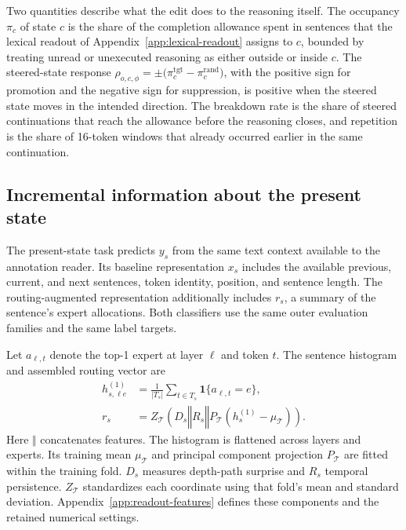 Two quantities describe what the edit does to the reasoning itself.
%
The occupancy $\pi_c$ of state $c$ is the share of the completion allowance spent in sentences that the lexical readout of Appendix~\ref{app:lexical-readout} assigns to $c$, bounded by treating unread or unexecuted reasoning as either outside or inside $c$.
%
The steered-state response $\rho_{o,c,\phi}=\pm\bigl(\pi^{\mathrm{tgt}}_c-\pi^{\mathrm{rand}}_c\bigr)$, with the positive sign for promotion and the negative sign for suppression, is positive when the steered state moves in the intended direction.
%
The breakdown rate is the share of steered continuations that reach the allowance before the reasoning closes, and repetition is the share of 16-token windows that already occurred earlier in the same continuation.
%

\subsection{Incremental information about the present state}
\label{sec:present-method}

The present-state task predicts $y_s$ from the same text context available to the annotation reader.
%
Its baseline representation $x_s$ includes the available previous, current, and next sentences, token identity, position, and sentence length.
%
The routing-augmented representation additionally includes $r_s$, a summary of the sentence's expert allocations.
%
Both classifiers use the same outer evaluation families and the same label targets.
%

Let $a_{\ell,t}$ denote the top-1 expert at layer $\ell$ and token $t$.
%
The sentence histogram and assembled routing vector are
\begin{equation}
\begin{aligned}
 h^{(1)}_{s,\ell e}&=\frac{1}{|T_s|}\sum_{t\in T_s}
 \mathbf{1}\{a_{\ell,t}=e\},\\
 r_s&=Z_{\mathcal T}\!\left(
 D_s\mathbin{\Vert}R_s\mathbin{\Vert}
 P_{\mathcal T}(h^{(1)}_s-\mu_{\mathcal T})\right).
\end{aligned}
\label{eq:present-features}
\end{equation}
Here $\Vert$ concatenates features.
%
The histogram is flattened across layers and experts.
%
Its training mean $\mu_{\mathcal T}$ and principal component projection $P_{\mathcal T}$ are fitted within the training fold.
%
$D_s$ measures depth-path surprise and $R_s$ temporal persistence.
%
$Z_{\mathcal T}$ standardizes each coordinate using that fold's mean and standard deviation.
%
Appendix~\ref{app:readout-features} defines these components and the retained numerical settings.
%

